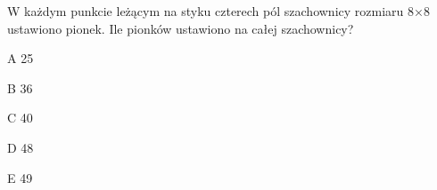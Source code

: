 \begin{tresc}
W każdym punkcie leżącym na styku czterech pól szachownicy rozmiaru 8×8 ustawiono pionek. Ile pionków ustawiono na całej szachownicy?
\end{tresc}
\begin{wariant}{A} 25 \end{wariant}
\begin{wariant}{B} 36 \end{wariant}
\begin{wariant}{C} 40 \end{wariant}
\begin{wariant}{D} 48 \end{wariant}
\begin{wariant}{E} 49 \end{wariant}
